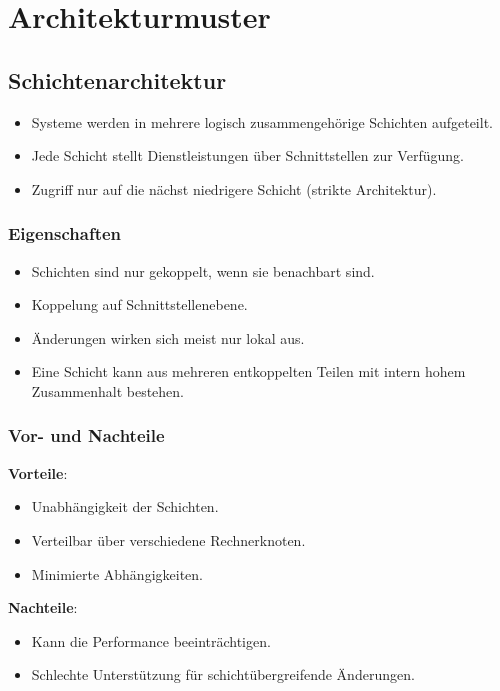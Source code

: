 \documentclass[11pt, a4paper]{article}
\begin{document}
\raggedright \section{Architekturmuster} %


\subsection{Schichtenarchitektur}

\begin{itemize}
    \item Systeme werden in mehrere logisch zusammengehörige Schichten aufgeteilt.
    \item Jede Schicht stellt Dienstleistungen über Schnittstellen zur Verfügung.
    \item Zugriff nur auf die nächst niedrigere Schicht (strikte Architektur).
\end{itemize}

\subsubsection{Eigenschaften}
\begin{itemize}
    \item Schichten sind nur gekoppelt, wenn sie benachbart sind.
    \item Koppelung auf Schnittstellenebene.
    \item Änderungen wirken sich meist nur lokal aus.
    \item Eine Schicht kann aus mehreren entkoppelten Teilen mit intern hohem Zusammenhalt bestehen.
\end{itemize}

\subsubsection{Vor- und Nachteile}

\textbf{Vorteile}:
\begin{itemize}
    \item Unabhängigkeit der Schichten.
    \item Verteilbar über verschiedene Rechnerknoten.
    \item Minimierte Abhängigkeiten.
\end{itemize}

\textbf{Nachteile}:
\begin{itemize}
    \item Kann die Performance beeinträchtigen.
    \item Schlechte Unterstützung für schichtübergreifende Änderungen.
\end{itemize}
\end{document}
